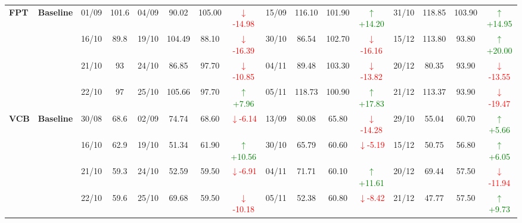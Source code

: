 {\begin{longtable}{llcc|cccc|cccc|cccc}
\multirow{4}{*}{\textbf{FPT}}
& \textbf{Baseline}
& 01/09 & 101.6 & 04/09 & 90.02 & 105.00 & \textcolor{red}{\(\downarrow\)-14.98} & 15/09 & 116.10 & 101.90 & \textcolor{green}{\(\uparrow\)+14.20} & 31/10 & 118.85 & 103.90 & \textcolor{green}{\(\uparrow\)+14.95} \\
& & 16/10 & 89.8 & 19/10 & 104.49 & 88.10 & \textcolor{red}{\(\downarrow\)-16.39} & 30/10 & 86.54 & 102.70 & \textcolor{red}{\(\downarrow\)-16.16} & 15/12 & 113.80 & 93.80 & \textcolor{green}{\(\uparrow\)+20.00} \\
& & 21/10 & 93 & 24/10 & 86.85 & 97.70 & \textcolor{red}{\(\downarrow\)-10.85} & 04/11 & 89.48 & 103.30 & \textcolor{red}{\(\downarrow\)-13.82} & 20/12 & 80.35 & 93.90 & \textcolor{red}{\(\downarrow\)-13.55} \\
& & 22/10 & 97 & 25/10 & 105.66 & 97.70 & \textcolor{green}{\(\uparrow\)+7.96} & 05/11 & 118.73 & 100.90 & \textcolor{green}{\(\uparrow\)+17.83} & 21/12 & 113.37 & 93.90 & \textcolor{red}{\(\downarrow\)-19.47} \\
\midrule

\multirow{4}{*}{\textbf{VCB}}
& \textbf{Baseline}
& 30/08 & 68.6 & 02/09 & 74.74 & 68.60 & \textcolor{red}{\(\downarrow\)-6.14} & 13/09 & 80.08 & 65.80 & \textcolor{red}{\(\downarrow\)-14.28} & 29/10 & 55.04 & 60.70 & \textcolor{green}{\(\uparrow\)+5.66} \\
& & 16/10 & 62.9 & 19/10 & 51.34 & 61.90 & \textcolor{green}{\(\uparrow\)+10.56} & 30/10 & 65.79 & 60.60 & \textcolor{red}{\(\downarrow\)-5.19} & 15/12 & 50.75 & 56.80 & \textcolor{green}{\(\uparrow\)+6.05} \\
& & 21/10 & 59.3 & 24/10 & 52.59 & 59.50 & \textcolor{red}{\(\downarrow\)-6.91} & 04/11 & 71.71 & 60.10 & \textcolor{green}{\(\uparrow\)+11.61} & 20/12 & 69.44 & 57.50 & \textcolor{red}{\(\downarrow\)-11.94} \\
& & 22/10 & 59.6 & 25/10 & 69.68 & 59.50 & \textcolor{red}{\(\downarrow\)-10.18} & 05/11 & 52.38 & 60.80 & \textcolor{red}{\(\downarrow\)-8.42} & 21/12 & 47.77 & 57.50 & \textcolor{green}{\(\uparrow\)+9.73} \\
\midrule


\end{longtable}}

